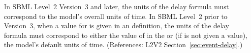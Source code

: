 In SBML Level~2 Version~3 and later, the units of the \Event delay formula
must correspond to the model's overall units of time.  In SBML Level~2
prior to Version~3, when a value for  is given in an \Event
definition, the units of the delay formula must correspond to either the
value of  in the \Event or (if  is not
given a value), the model's default units of time.  (References: L2V2
Section~\ref{sec:event-delay}.)
